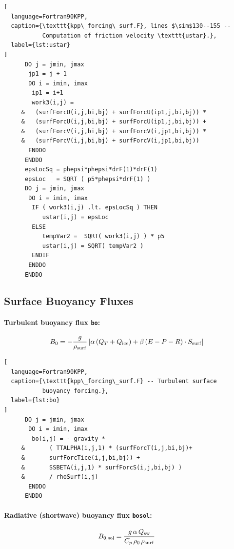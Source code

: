 \documentclass[12pt,letterpaper]{article}
\begin{document}
\begin{lstlisting}[  
  language=Fortran90KPP,  
  caption={\texttt{kpp\_forcing\_surf.F}, lines $\sim$130--155 --  
           Computation of friction velocity \texttt{ustar}.},  
  label={lst:ustar}  
]  
      DO j = jmin, jmax  
       jp1 = j + 1  
       DO i = imin, imax  
        ip1 = i+1  
        work3(i,j) =  
     &   (surfForcU(i,j,bi,bj) + surfForcU(ip1,j,bi,bj)) *  
     &   (surfForcU(i,j,bi,bj) + surfForcU(ip1,j,bi,bj)) +  
     &   (surfForcV(i,j,bi,bj) + surfForcV(i,jp1,bi,bj)) *  
     &   (surfForcV(i,j,bi,bj) + surfForcV(i,jp1,bi,bj))  
       ENDDO  
      ENDDO  
      epsLocSq = phepsi*phepsi*drF(1)*drF(1)  
      epsLoc   = SQRT ( p5*phepsi*drF(1) )  
      DO j = jmin, jmax  
       DO i = imin, imax  
        IF ( work3(i,j) .lt. epsLocSq ) THEN  
           ustar(i,j) = epsLoc  
        ELSE  
           tempVar2 =  SQRT( work3(i,j) ) * p5  
           ustar(i,j) = SQRT( tempVar2 )  
        ENDIF  
       ENDDO  
      ENDDO  
\end{lstlisting}  
  
\subsection{Surface Buoyancy Fluxes}  
  
\paragraph{Turbulent buoyancy flux \texttt{bo}:}  
\begin{equation}  
B_0 = -\frac{g}{\rho_{\rm surf}}\left[\alpha\,(Q_T + Q_{\rm ice})  
+ \beta\,(E - P - R)\cdot S_{\rm surf}\right]  
\end{equation}  
  
\begin{lstlisting}[  
  language=Fortran90KPP,  
  caption={\texttt{kpp\_forcing\_surf.F} -- Turbulent surface  
           buoyancy forcing.},  
  label={lst:bo}  
]  
      DO j = jmin, jmax  
       DO i = imin, imax  
        bo(i,j) = - gravity *  
     &       ( TTALPHA(i,j,1) * (surfForcT(i,j,bi,bj)+  
     &       surfForcTice(i,j,bi,bj)) +  
     &       SSBETA(i,j,1) * surfForcS(i,j,bi,bj) )  
     &       / rhoSurf(i,j)  
       ENDDO  
      ENDDO  
\end{lstlisting}  
  
\paragraph{Radiative (shortwave) buoyancy flux \texttt{bosol}:}  
\begin{equation}  
B_{0,\rm sol} = \frac{g\,\alpha\,Q_{\rm sw}}{C_p\,\rho_0\,\rho_{\rm surf}}  
\end{equation}  
  
\end{document}
